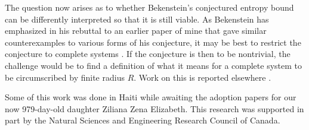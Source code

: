 \documentclass[a4paper,12pt]{article}
\begin{document}
	The question now arises as to
whether Bekenstein's conjectured entropy
bound can be differently interpreted
so that it is still viable.
As Bekenstein has emphasized
\cite{Bek9}
in his rebuttal to an earlier paper
of mine
\cite{Page2}
that gave similar counterexamples
to various forms of his conjecture,
it may be best to restrict the conjecture
to complete systems
\cite{Bek3,Bek6}.
If the conjecture is then to be nontrivial,
the challenge would be to find
a definition of what it means for
a complete system to be circumscribed
by finite radius $R$.  Work on this is
reported elsewhere
\cite{Page3}.

	Some of this work was done in Haiti
while awaiting the adoption papers
for our now 979-day-old daughter
Ziliana Zena Elizabeth.
This research was supported in part by
the Natural Sciences and Engineering Research
Council of Canada.

\baselineskip 4pt
\end{document}
